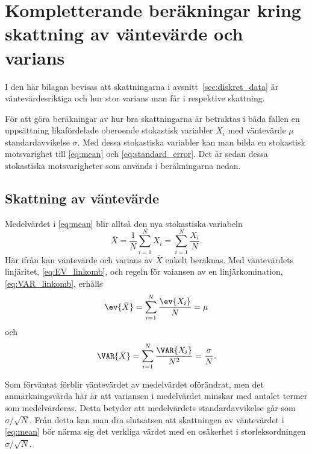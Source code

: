 \chapter{Kompletterande beräkningar kring skattning av väntevärde och varians}
\label{sec:noggrannhet}

I den här bilagan bevisas att skattningarna i avsnitt~\ref{sec:diskret_data} är väntevärdesriktiga och hur stor varians man får i respektive skattning.

För att göra beräkningar av hur bra skattningarna är betraktas i båda fallen en uppsättning likafördelade oberoende stokastisk variabler $X_i$ med väntevärde $\mu$ standardavvikelse $\sigma$. Med dessa stokastiska variabler kan man bilda en stokastisk motsvarighet\footnotemark{} till \eqref{eq:mean} och \eqref{eq:standard_error}. Det är sedan dessa stokastiska motsvarigheter som används i beräkningarna nedan. 



\section{Skattning av väntevärde}
Medelvärdet i \eqref{eq:mean} blir alltså den nya stokastiska variabeln
\begin{equation}
\bar{X} = \frac{1}{N} \sum_{i=1}^N X_i = \sum_{i=1}^N \frac{X_i}{N}.
\end{equation}
Här ifrån kan väntevärde och varians av $\bar{X}$ enkelt beräknas. Med väntevärdets linjäritet, \eqref{eq:EV_linkomb}, och regeln för vaiansen av en linjärkomination, \eqref{eq:VAR_linkomb}, erhålls
\begin{equation}
\ev{\bar{X}} = \sum_{i=1}^N \frac{\ev{X_i}}{N} = \mu
\end{equation}
och
\begin{equation}
\VAR{\bar{X}} = \sum_{i=1}^N \frac{\VAR{X_i}}{N^2} = \frac{\sigma}{N}.
\end{equation}

Som förväntat förblir väntevärdet av medelvärdet oförändrat, men det anmärkningsvärda här är att variansen i medelvärdet minskar med antalet termer som medelvärderas. Detta betyder att medelvärdets standardavvikelse går som $\sigma/\sqrt{N}$.
Från detta kan man dra slutsatsen att skattningen av väntevärdet i \eqref{eq:mean} bör närma sig det verkliga värdet med en osäkerhet i storleksordningen $\sigma/\sqrt{N}$. 

